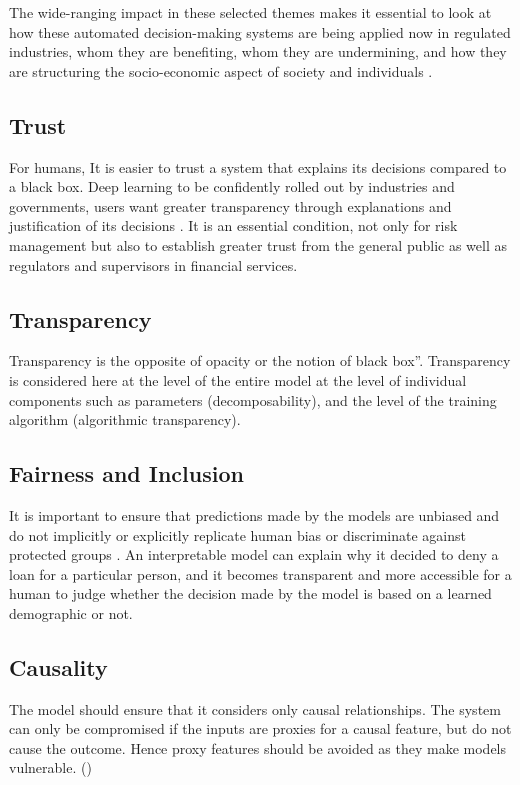 The wide-ranging impact in these selected themes makes it essential to look at how these automated decision-making systems are being applied now in regulated industries, whom they are benefiting, whom they are undermining, and how they are structuring the socio-economic aspect of society and individuals \cite{ainow2016report}.

\subsection{Trust}

For humans, It is easier to trust a system that explains its decisions compared to a black box. Deep learning to be confidently rolled out by industries and governments, users want greater transparency through explanations and justification of its decisions \cite{molnar}. It is an essential condition, not only for risk management but also to establish greater trust from the general public as well as regulators and supervisors in financial services. 

\subsection{Transparency}

Transparency is the opposite of opacity or the notion of black box”. Transparency is considered here at the level of the entire model at the level of individual components such as parameters (decomposability), and the level of the training algorithm (algorithmic transparency). 

\subsection{Fairness and Inclusion}

It is important to ensure that predictions made by the models are unbiased and do not implicitly or explicitly replicate human bias or discriminate against protected groups \cite{ainow2016report}. An interpretable model can explain why it decided to deny a loan for a particular person, and it becomes transparent and more accessible for a human to judge whether the decision made by the model is based on a learned demographic or not.

\subsection{Causality}
The model should ensure that it considers only causal relationships.  The system can only be compromised if the inputs are proxies for a causal feature, but do not cause the outcome. Hence proxy features should be avoided as they make models vulnerable. (\cite{molnar})

